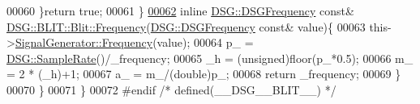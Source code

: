 \begin{DoxyCode}
00060             \}\textcolor{keywordflow}{return} \textcolor{keyword}{true};
00061         \}
\hypertarget{_b_l_i_t_8h_source_l00062}{}\hyperlink{class_d_s_g_1_1_b_l_i_t_1_1_blit_a933f8f9f324a4fde4f9e2b69473d88ed}{00062}         \textcolor{keyword}{inline} \hyperlink{namespace_d_s_g_a4315a061386fa1014fda09b15d3a6973}{DSG::DSGFrequency} \textcolor{keyword}{const}& 
      \hyperlink{class_d_s_g_1_1_signal_generator_a4e6b3c43e76e53f8cd337ad699c464cb}{DSG::BLIT::Blit::Frequency}(\hyperlink{namespace_d_s_g_a4315a061386fa1014fda09b15d3a6973}{DSG::DSGFrequency} \textcolor{keyword}{const}& value)\{
00063             this->\hyperlink{class_d_s_g_1_1_signal_generator_a4e6b3c43e76e53f8cd337ad699c464cb}{SignalGenerator::Frequency}(value);
00064             p\_ = \hyperlink{namespace_d_s_g_a72df05177db0412c3590070923f62819}{DSG::SampleRate}()/\_frequency;
00065             \_h = (unsigned)floor(p\_*0.5);
00066             m\_ = 2 * (\_h)+1;
00067             a\_ = m\_/(double)p\_;
00068             \textcolor{keywordflow}{return} \_frequency;
00069         \}
00070     \}
00071 \}
00072 \textcolor{preprocessor}{#endif }\textcolor{comment}{/* defined(\_\_DSG\_\_BLIT\_\_) */}\textcolor{preprocessor}{}
\end{DoxyCode}
